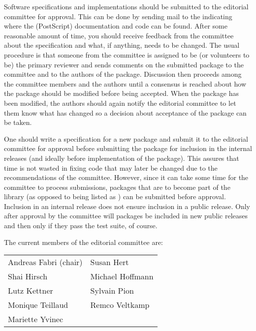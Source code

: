 Software specifications and implementations should be submitted to the 
editorial committee for approval.  This can be done by sending mail to 
the 
 indicating
where the (PostScript) documentation and code can be found.  After
some reasonable amount of time, you should receive feedback from 
the committee about the specification and what, if anything, needs to
be changed. The usual procedure is that someone from the committee is
assigned to be (or volunteers to be) the primary reviewer and sends 
comments on the submitted package to the committee and to the authors of
the package.  Discussion then proceeds among the committee members and the
authors until a consensus is reached about how the package should be
modified before being accepted.  When the package has been modified,
the authors should again notify the editorial committee to let them
know what has changed so a decision about acceptance of the package
can be taken.  


One should write a specification for a new package
and submit it to the editorial committee for 
approval before submitting the package for inclusion in the internal
releases (and ideally before implementation of the package).  This
assures that time is not wasted in fixing code that may later be changed
due to the recommendations of the committee.
However, since it can take some time for the committee to process
submissions, packages that are to become part of the library 
(as opposed to being listed as 
)
can be submitted 
 before approval.
Inclusion in an internal release does not ensure inclusion in a public
release.  Only after approval by the committee will packages be included in new
public releases and then only if they pass the test suite, of course.

The current members of the editorial committee are:
\begin{center}
\begin{tabular}{p{5cm}p{5cm}}
Andreas Fabri (chair)  & Susan Hert  \\
Shai Hirsch            & Michael Hoffmann \\
Lutz Kettner           & Sylvain Pion  \\
Monique Teillaud       & Remco Veltkamp \\
Mariette Yvinec 
\end{tabular}
\end{center}

